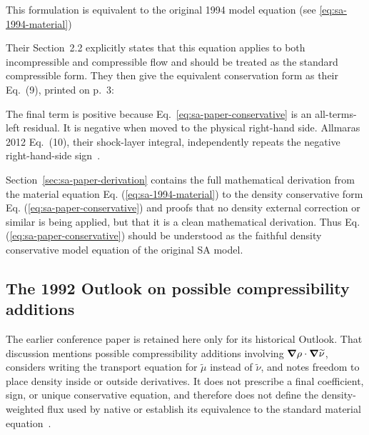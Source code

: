 This formulation is equivalent to the original 1994 model equation (see \ref{eq:sa-1994-material})

Their Section~2.2 explicitly states that this equation applies to both
incompressible and compressible flow and should be treated as the standard
compressible form.  They then give the equivalent conservation form as their
Eq.~(9), printed on p.~3:

\par
The final term is positive because Eq.~\eqref{eq:sa-paper-conservative} is an
all-terms-left residual.  It is negative when moved to the physical
right-hand side.  Allmaras 2012 Eq.~(10), their shock-layer integral, independently
repeats the negative right-hand-side sign~\cite{AJS2012}.

Section~\ref{sec:sa-paper-derivation} contains the full mathematical derivation from the material equation Eq. (\ref{eq:sa-1994-material}) to the density conservative form Eq. (\ref{eq:sa-paper-conservative}) and proofs that no density external correction or similar is being applied, but that it is a clean mathematical derivation. Thus Eq. (\ref{eq:sa-paper-conservative}) should be understood as the faithful density conservative model equation of the original SA model.

\subsection{The 1992 Outlook on possible compressibility additions}

The earlier conference paper is retained here only for its historical Outlook.
That discussion mentions possible compressibility additions involving
\(\boldsymbol{\nabla}\rho\cdot\boldsymbol{\nabla}\widetilde{\nu}\), considers writing the transport
equation for \(\widetilde{\mu}\) instead of \(\widetilde{\nu}\), and notes
freedom to place density inside or outside derivatives.  It does not prescribe
a final coefficient, sign, or unique conservative equation, and therefore does
not define the density-weighted flux used by native \SAOF{} or establish its
equivalence to the standard material equation~\cite{SpalartAllmaras1992}.

